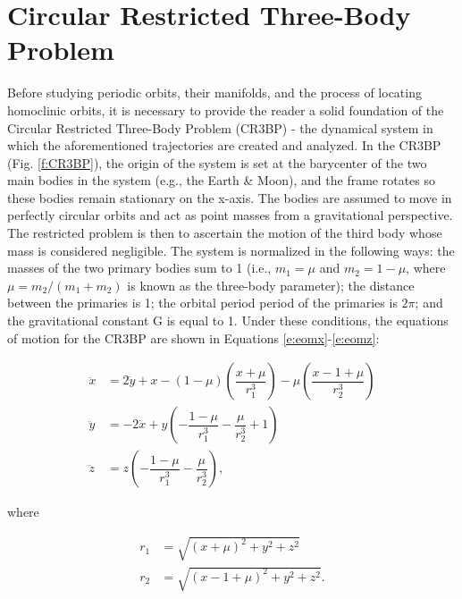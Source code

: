 \documentclass[11pt]{article} %
\begin{document}
\section{Circular Restricted Three-Body Problem}
Before studying periodic orbits, their manifolds, and the process of locating homoclinic orbits, it is necessary to provide the reader a solid foundation of the Circular Restricted Three-Body Problem (CR3BP) - the dynamical system in which the aforementioned trajectories are created and analyzed. In the CR3BP (Fig. \ref{f:CR3BP}), the origin of the system is set at the barycenter of the two main bodies in the system (e.g., the Earth \& Moon), and the frame rotates so these bodies remain stationary on the x-axis. The bodies are assumed to move in perfectly circular orbits and act as point masses from a gravitational perspective. The restricted problem is then to ascertain the motion of the third body whose mass is considered negligible. The system is  normalized in the following ways: the masses of the two primary bodies sum to 1 (i.e., $m_1 = \mu$ and $m_2 = 1-\mu$, where $\mu = m_2/(m_1+m_2)$ is known as the three-body parameter); the distance between the primaries is 1; the orbital period period of the primaries is $2\pi$; and the gravitational constant G is equal to 1. Under these conditions, the equations of motion for the CR3BP are shown in Equations \ref{e:eomx}-\ref{e:eomz}:

\begin{align}
	\ddot{x} &= 2\dot{y} + x - (1-\mu)\left(\dfrac{x+\mu}{r_1^3}\right) - \mu\left(\dfrac{x-1+\mu}{r_2^3}\right) \label{e:eomx}\\
	\ddot{y} &= -2\dot{x} + y\left(-\dfrac{1-\mu}{r_1^3} - \dfrac{\mu}{r_2^3} + 1\right) \label{e:eomy}\\
	\ddot{z} &= z\left(-\dfrac{1 - \mu}{r_1^3} - \dfrac{\mu}{r_2^3}\right), \label{e:eomz}
\end{align} 

\noindent
where

\begin{align}
	r_1 & = \sqrt{\left(x + \mu\right)^2 + y^2 + z^2} \\
	r_2 & = \sqrt{\left(x - 1 + \mu\right)^2 + y^2 + z^2}.
\end{align}
\end{document}
